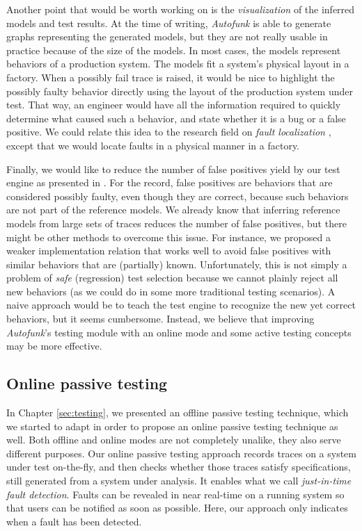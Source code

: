 Another point that would be worth working on is the
\emph{visualization} of the inferred models and test results. At
the time of writing, \emph{Autofunk} is able to generate graphs
representing the generated models, but they are not really usable
in practice because of the size of the models. In most cases, the
models represent behaviors of a production system. The models fit
a system's physical layout in a factory. When a possibly fail
trace is raised, it would be nice to highlight the possibly
faulty behavior directly using the layout of the production
system under test. That way, an engineer would have all the
information required to quickly determine what caused such a
behavior, and state whether it is a bug or a false positive. We
could relate this idea to the research field on \emph{fault
localization} \cite{jones2002visualization,wong2010software},
except that we would locate faults in a physical manner in a
factory.

Finally, we would like to reduce the number of false positives
yield by our test engine as presented in
. For the
record, false positives are behaviors that are considered
possibly faulty, even though they are correct, because such
behaviors are not part of the reference models. We already know
that inferring reference models from large sets of traces reduces
the number of false positives, but there might be other methods
to overcome this issue. For instance, we proposed a weaker
implementation relation that works well to avoid false positives
with similar behaviors that are (partially) known. Unfortunately,
this is not simply a problem of \emph{safe} (regression) test
selection \cite{orso2004scaling} because we cannot plainly reject
all new behaviors (as we could do in some more traditional
testing scenarios). A naive approach would be to teach the test
engine to recognize the new yet correct behaviors, but it seems
cumbersome. Instead, we believe that improving \emph{Autofunk}'s
testing module with an online mode and some active testing
concepts may be more effective.


\subsection{Online passive testing}
\label{sec:conclusion:testing:online}

In Chapter \ref{sec:testing}, we presented an offline passive
testing technique, which we started to adapt in order to propose
an online passive testing technique as well. Both offline and
online modes are not completely unalike, they also serve
different purposes.
Our online passive testing approach records traces on a system
under test on-the-fly, and then checks whether those traces
satisfy specifications, still generated from a system under
analysis. It enables what we call \emph{just-in-time fault
detection}. Faults can be revealed in near real-time on a running
system so that users can be notified as soon as possible. Here,
our approach only indicates when a fault has been detected.

